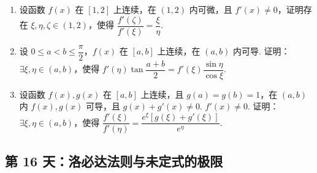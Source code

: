 \newpage

\begin{enumerate}[label=\textbf{\arabic*.}, itemsep=6cm, resume]
    \item 设函数 $f(x)$ 在 $[1,2]$ 上连续，在 $(1,2)$ 内可微，且 $f'(x) \ne 0$，证明存在 $\xi, \eta, \zeta \in (1,2)$，使得
    $ \dfrac{f'(\zeta)}{f'(\xi)} = \dfrac{\xi}{\eta}. $
    
    \item 设 $0 \le a < b \le \dfrac{\pi}{2}$，$f(x)$ 在 $[a,b]$ 上连续，在 $(a,b)$ 内可导. 证明：$\exists \xi, \eta \in (a,b)$，使得
    $ f'(\eta)\tan\dfrac{a+b}{2} = f'(\xi)\dfrac{\sin\eta}{\cos\xi}. $
    
    \item 设函数 $f(x), g(x)$ 在 $[a,b]$ 上连续，且 $g(a) = g(b) = 1$，在 $(a,b)$ 内 $f(x), g(x)$ 可导，且 $g(x)+g'(x) \ne 0$. $f'(x) \ne 0$. 证明：$\exists \xi, \eta \in (a,b)$，使得
    $ \dfrac{f'(\xi)}{f'(\eta)} = \dfrac{e^\xi\left[g(\xi) + g'(\xi)\right]}{e^\eta}. $
\end{enumerate}

\newpage

\subsection*{第 16 天：洛必达法则与未定式的极限}
\vspace{1cm}

